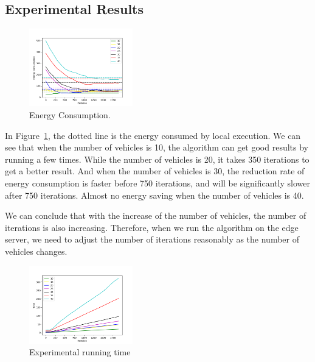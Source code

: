 \documentclass[conference]{IEEEtran}
\begin{document}
	\subsection{Experimental Results}
	\begin{figure}[htbp]
		\centering
		\includegraphics[width=0.40\textwidth]{energy.png}
		\caption{Energy Consumption. }
		\label{energy}
	\end{figure}
	In Figure~\ref{energy}, the dotted line is the energy consumed by local execution. 
	We can see that when the number of vehicles is 10, the algorithm can get good results by running a few times. While the number of vehicles is 20, it takes 350 iterations to get a better result. 
	And when the number of vehicles is 30, the reduction rate of energy consumption is faster before 750 iterations, and will be significantly slower after 750 iterations. 
	Almost no energy saving when the number of vehicles is 40. 
	
	We can conclude that with the increase of the number of vehicles, the number of iterations is also increasing. 
	Therefore, when we run the algorithm on the edge server, we need to adjust the number of iterations reasonably as the number of vehicles changes. 
	\begin{figure}[htbp]
		\centering
		\includegraphics[width=0.40\textwidth]{time.png}
		\caption{Experimental running time}
		\label{time}
	\end{figure}
	
\end{document}
